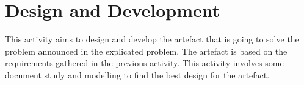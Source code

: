 \chapter{Design and Development}
This activity aims to design and develop the artefact that is going to solve the problem announced in the explicated problem. The artefact is based on the requirements gathered in the previous activity. This activity involves some document study and modelling to find the best design for the artefact.



